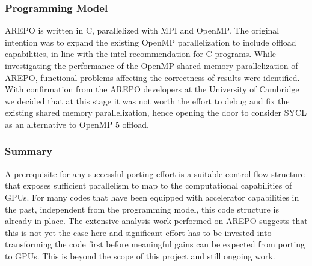 \documentclass[../main]{subfiles}
\begin{document}
\subsubsection{Programming Model}
AREPO is written in C, parallelized with MPI and OpenMP.
The original intention was to expand the existing OpenMP parallelization to include offload capabilities, in line with the intel recommendation for C programs.
While investigating the performance of the OpenMP shared memory parallelization of AREPO, functional problems affecting the correctness of results were identified.
With confirmation from the AREPO developers at the University of Cambridge we decided that at this stage it was not worth the effort to debug and fix the existing shared memory parallelization, hence opening the door to consider SYCL as an alternative to OpenMP 5 offload.


\subsubsection{Summary}
A prerequisite for any successful porting effort is a suitable control flow structure that exposes sufficient parallelism to map to the computational capabilities of GPUs.
For many codes that have been equipped with accelerator capabilities in the past, independent from the programming model, this code structure is already in place.
The extensive analysis work performed on AREPO suggests that this is not yet the case here and significant effort has to be invested into transforming the code first before meaningful gains can be expected from porting to GPUs.
This is beyond the scope of this project and still ongoing work.




\end{document}
